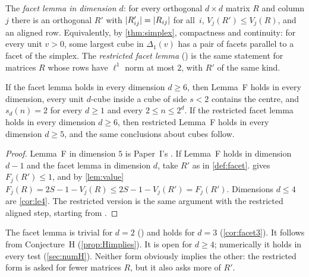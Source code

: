 \documentclass[11pt,a4paper]{article}
\newcommand{\status}[1]{\textsf{\small[#1]}}
\begin{document}
\begin{definition}\label{def:facet}
The \emph{facet lemma in dimension $d$}: for every orthogonal $d\times d$ matrix $R$ and column $j$ there is an orthogonal $R'$ with $\lvert R'_{ij}\rvert=\lvert R_{ij}\rvert$ for all~$i$, $V_j(R')\le V_j(R)$, and an aligned row. Equivalently, by \cref{thm:simplex}, compactness and continuity: for every unit $v>0$, some largest cube in $\Delta_1(v)$ has a pair of facets parallel to a facet of the simplex. The \emph{restricted facet lemma} () is the same statement for matrices $R$ whose rows have $\ell^1$ norm at most $2$, with $R'$ of the same kind.
\end{definition}

\begin{theorem}[Main Theorem B; \status{Lean}]\label{thm:mainB}
If the facet lemma holds in every dimension $d\ge6$, then Lemma~F holds in every dimension, every unit $d$-cube inside a cube of side $s<2$ contains the centre, and $s_d(n)=2$ for every $d\ge1$ and every $2\le n\le2^d$. If the restricted facet lemma holds in every dimension $d\ge6$, then restricted Lemma~F holds in every dimension $d\ge5$, and the same conclusions about cubes follow.
\end{theorem}
\begin{proof}
Lemma~F in dimension $5$ is Paper~I's . If Lemma~F holds in dimension $d-1$ and the facet lemma in dimension $d$, take $R'$ as in \cref{def:facet}.  gives $F_j(R')\le1$, and by \cref{lem:value} $F_j(R)=2S-1-V_j(R)\le 2S-1-V_j(R')=F_j(R')$. Dimensions $d\le4$ are \cref{cor:le4}. The restricted version is the same argument with the restricted aligned step, starting from .
\end{proof}

The facet lemma is trivial for $d=2$ () and holds for $d=3$ (\cref{cor:facet3}). It follows from Conjecture~H (\cref{prop:Himplies}). It is open for $d\ge4$; numerically it holds in every test (\cref{sec:numH}). Neither form obviously implies the other: the restricted form is asked for fewer matrices $R$, but it also asks more of $R'$.
\end{document}
